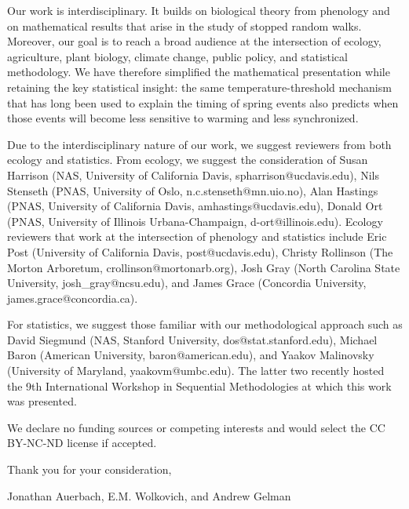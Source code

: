 \documentclass{amsart}
\begin{document}
Our work is interdisciplinary. It builds on biological theory from phenology and on mathematical results that arise in the study of stopped random walks. Moreover, our goal is to reach a broad audience at the intersection of ecology, agriculture, plant biology, climate change, public policy, and statistical methodology. We have therefore simplified the mathematical presentation while retaining the key statistical insight: the same temperature-threshold mechanism that has long been used to explain the timing of spring events also predicts when those events will become less sensitive to warming and less synchronized.

Due to the interdisciplinary nature of our work, we suggest reviewers from both ecology and statistics. From ecology, we suggest the consideration of Susan Harrison (NAS, University of California Davis, spharrison@ucdavis.edu), Nils Stenseth (PNAS, University of Oslo, n.c.stenseth@mn.uio.no), Alan Hastings (PNAS, University of California Davis, amhastings@ucdavis.edu), Donald Ort (PNAS, University of Illinois Urbana-Champaign, d-ort@illinois.edu). Ecology reviewers that work at the intersection of phenology and statistics include Eric Post (University of California Davis, post@ucdavis.edu), Christy Rollinson (The Morton Arboretum, crollinson@mortonarb.org), Josh Gray (North Carolina State University, josh\_gray@ncsu.edu), and James Grace (Concordia University, james.grace@concordia.ca). 

For statistics, we suggest those familiar with our methodological approach such as David Siegmund (NAS, Stanford University, dos@stat.stanford.edu), Michael Baron (American University, baron@american.edu), and Yaakov Malinovsky (University of Maryland, yaakovm@umbc.edu). The latter two recently hosted the 9th International Workshop in Sequential Methodologies at which this work was presented. 

We declare no funding sources or competing interests and would select the CC BY-NC-ND license if accepted.  \newline \vspace{-.75em}

Thank you for your consideration,

Jonathan Auerbach, E.M. Wolkovich, and Andrew Gelman
\end{document}
